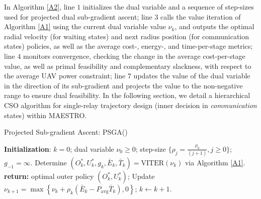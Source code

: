 \documentclass[12pt, draftcls, onecolumn]{IEEEtran}
\theoremstyle{plain}
\theoremstyle{definition}
\theoremstyle{remark}
\begin{document}
In Algorithm \ref{A2}, line $1$ initializes the dual variable and a sequence of step-sizes used for projected dual sub-gradient ascent; line $3$ calls the value iteration of Algorithm \ref{A1} using the current dual variable value $\nu_{k}$, and outputs the optimal radial velocity (for waiting states) and next radius position (for communication states) policies, as well as the average cost-, energy-, and time-per-stage metrics; line $4$ monitors convergence, checking the change in the average cost-per-stage value, as well as primal feasibility and complementary slackness, with respect to the average UAV power constraint; line $7$ updates the value of the dual variable in the direction of its sub-gradient and projects the value to the non-negative range to ensure dual feasibility. In the following section, we detail a hierarchical CSO algorithm for single-relay trajectory design (inner decision in \emph{communication} states) within MAESTRO.

\begin{algorithm}[t]
\caption{Projected Sub-gradient Ascent: PSGA()}\label{A2}
    \begin{algorithmic}[1]
    \State \textbf{Initialization}: $k{=}0$; dual variable $\nu_{0}{\geq}0$; step-size $\{\rho_{j}{=}\frac{\rho_{0}}{(j{+}1)},j{\geq}0\}$; $g_{-1}{=}\infty$.
    \vspace{.2cm}
        \vspace{.2cm}
    	\State Determine $(O_{k}^{*},U_{k}^{*},g_{k},\bar{E}_{k},\bar{T}_{k})=\mathrm{VITER}\left(\nu_{k}\right)$ via Algorithm \ref{A1}.
    	\vspace{.2cm}
    	    \vspace{.2cm}
    	    \State \textbf{return:} optimal outer policy $(O_{k}^{*},U_{k}^{*})$;
    	    \vspace{.2cm}
    	\Else
    	    \vspace{.2cm}
    		\State Update $\nu_{k{+}1}{=}\max\left\{\nu_{k}{+}\rho_{k}\left( \bar{E}_{k}{-}P_{\mathrm{avg}}\bar{T}_{k}\right),0\right\}$; $k{\gets}k{+}1$.
    		\vspace{.2cm}
    	\EndIf
    	\vspace{.2cm}
    \EndFor
    \end{algorithmic}
\end{algorithm}
\vspace{-4mm}
\end{document}
